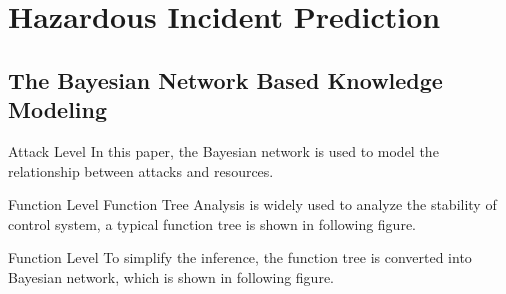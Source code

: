\label{Section: Hazardous Incident Prediction}
\section{Hazardous Incident Prediction}
\subsection{The Bayesian Network Based Knowledge Modeling}
\begin{frame}{Attack Level}
    \label{Hazardous Incident Prediction: Attack Level}
    In this paper, the Bayesian network is used to model the relationship between attacks and resources.
    \begin{center}
      
    \end{center}
\end{frame}

\begin{frame}{Function Level}
    \label<trans:1>{Hazardous Incident Prediction: Function Tree F1}
    \label<trans:2>{Hazardous Incident Prediction: Function Tree F2}
    \label<trans:3>{Hazardous Incident Prediction: Function Tree F5}
    Function Tree Analysis is widely used to analyze the stability of control system, a typical function tree is shown in following figure.
    \begin{center}
      
    \end{center}

    \begin{overlayarea}{\textwidth}{1cm}
    \end{overlayarea}
\end{frame}

\begin{frame}{Function Level}
    \label<trans:1>{Hazardous Incident Prediction: Function Tree to Bayesian Network Gate 1}
    \label<trans:2>{Hazardous Incident Prediction: Function Tree to Bayesian Network Gate 2}
    \label<trans:3>{Hazardous Incident Prediction: Function Tree to Bayesian Network Gate 3}
    To simplify the inference, the function tree is converted into Bayesian network, which is shown in following figure.\\
    \begin{overlayarea}{\textwidth}{6cm}
    \begin{center}
    \end{center}
    \end{overlayarea}
\end{frame}

